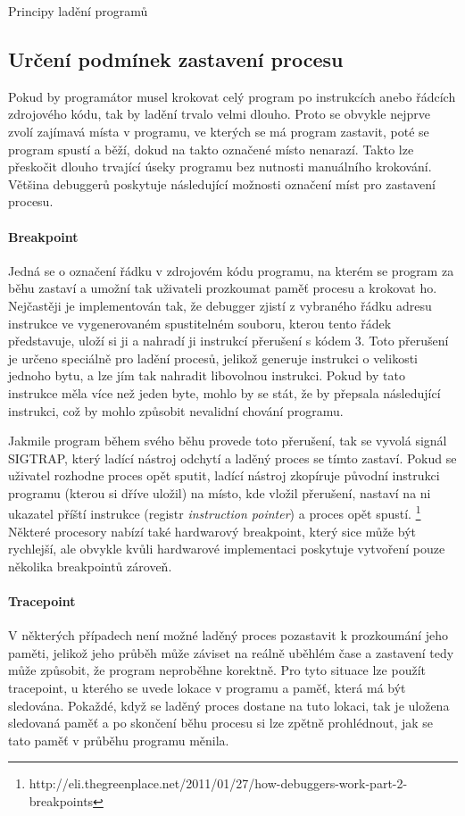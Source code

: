 \documentclass[czech,bachelor,male,python,dept460,hidelinks]{diploma}						%
\newcommand{\parspace}[1][]{
	\ifthenelse{\isempty{#1}}{\vspace{5mm}}{\vspace{#1}}
	\par
}
\begin{document}
\begin{section}{Principy ladění programů}
	\subsection{Určení podmínek zastavení procesu}
		Pokud by programátor musel krokovat celý program po instrukcích anebo řádcích zdrojového kódu, tak by ladění trvalo velmi dlouho.
		Proto se obvykle nejprve zvolí zajímavá místa v programu, ve kterých se má program zastavit, poté se program spustí a běží, dokud na takto označené místo
		nenarazí. Takto lze přeskočit dlouho trvající úseky programu bez nutnosti manuálního krokování. Většina debuggerů poskytuje následující možnosti označení
		míst pro zastavení procesu.
		
		\paragraph*{Breakpoint}
			Jedná se o označení řádku v zdrojovém kódu programu, na kterém se program za běhu zastaví a umožní tak uživateli prozkoumat paměť procesu a krokovat ho.
			Nejčastěji je implementován tak, že debugger zjistí z vybraného řádku adresu instrukce ve vygenerovaném spustitelném souboru, kterou tento
			řádek představuje, uloží si ji a nahradí ji instrukcí přerušení s kódem 3. Toto přerušení je určeno speciálně pro ladění procesů, jelikož generuje
			instrukci o velikosti jednoho bytu, a lze jím tak nahradit libovolnou instrukci. \cite[306]{intel} Pokud by tato instrukce měla více než jeden byte,
			mohlo by se stát, že by přepsala následující instrukci, což by mohlo způsobit nevalidní chování programu.
			
			\parspace Jakmile program během svého běhu
			provede toto přerušení, tak se vyvolá signál SIGTRAP, který ladící nástroj odchytí a laděný proces se tímto zastaví. Pokud se uživatel rozhodne proces
			opět sputit, ladící nástroj zkopíruje původní instrukci programu (kterou si dříve uložil) na místo, kde vložil přerušení, nastaví na ni ukazatel
			příští instrukce (registr \textit{instruction pointer}) a proces opět spustí.
			\footnote{http://eli.thegreenplace.net/2011/01/27/how-debuggers-work-part-2-breakpoints}
			Některé procesory nabízí také hardwarový breakpoint, který sice může být rychlejší, ale obvykle kvůli hardwarové implementaci poskytuje
			vytvoření pouze několika breakpointů zároveň.
		\paragraph*{Tracepoint}
			V některých případech není možné laděný proces pozastavit k prozkoumání jeho paměti, jelikož jeho průběh může záviset na reálně uběhlém čase a zastavení
			tedy může způsobit, že program neproběhne korektně. Pro tyto situace lze použít tracepoint, u kterého se uvede lokace v programu a paměť, která má být
			sledována. Pokaždé, když se laděný proces dostane na tuto lokaci, tak je uložena sledovaná paměť a po skončení běhu procesu si lze zpětně prohlédnout,
			jak se tato paměť v průběhu programu měnila.

\end{section}
\end{document}
